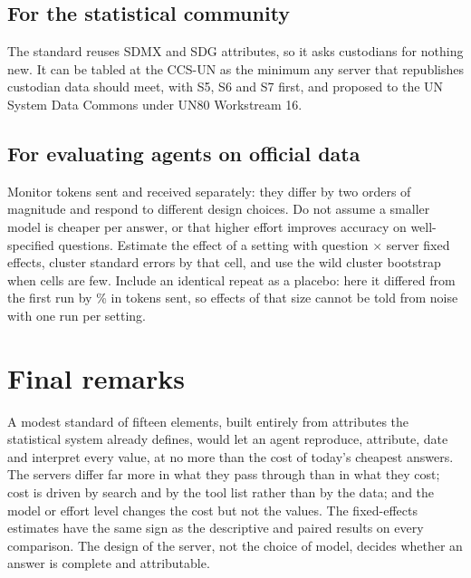 \documentclass[11pt,a4paper]{article}
\begin{document}
\subsection{For the statistical community}
The standard reuses SDMX and SDG attributes, so it asks custodians for nothing new. It can be tabled at the CCS-UN as the minimum any server that republishes custodian data should meet, with S5, S6 and S7 first, and proposed to the UN System Data Commons under UN80 Workstream 16.

\subsection{For evaluating agents on official data}
Monitor tokens sent and received separately: they differ by two orders of magnitude and respond to different design choices. Do not assume a smaller model is cheaper per answer, or that higher effort improves accuracy on well-specified questions. Estimate the effect of a setting with question $\times$ server fixed effects, cluster standard errors by that cell, and use the wild cluster bootstrap when cells are few. Include an identical repeat as a placebo: here it differed from the first run by \efRepSent\% in tokens sent, so effects of that size cannot be told from noise with one run per setting.

\section{Final remarks}\label{sec:final}

A modest standard of fifteen elements, built entirely from attributes the statistical system already defines, would let an agent reproduce, attribute, date and interpret every value, at no more than the cost of today's cheapest answers. The servers differ far more in what they pass through than in what they cost; cost is driven by search and by the tool list rather than by the data; and the model or effort level changes the cost but not the values. The fixed-effects estimates have the same sign as the descriptive and paired results on every comparison. The design of the server, not the choice of model, decides whether an answer is complete and attributable.
\end{document}
